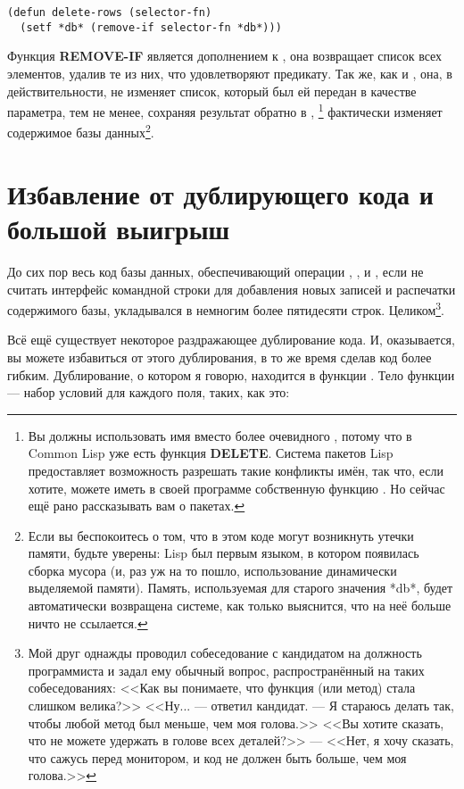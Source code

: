 \begin{lstlisting}
(defun delete-rows (selector-fn)
  (setf *db* (remove-if selector-fn *db*)))
\end{lstlisting}

Функция \textbf{REMOVE-IF} является дополнением к , она возвращает
список всех элементов, удалив те из них, что удовлетворяют предикату. Так же, как и
, она, в действительности, не изменяет список, который был ей передан
в качестве параметра, тем не менее, сохраняя результат обратно в ,
\footnote{Вы должны использовать имя  вместо более
  очевидного , потому что в Common Lisp уже есть функция
  \textbf{DELETE}. Система пакетов Lisp предоставляет возможность разрешать такие
  конфликты имён, так что, если хотите, можете иметь в своей программе собственную функцию
  . Но сейчас ещё рано рассказывать вам о пакетах.} фактически изменяет
содержимое базы данных\footnote{Если вы беспокоитесь о том, что в этом коде могут
  возникнуть утечки памяти, будьте уверены: Lisp был первым языком, в котором появилась
  сборка мусора (и, раз уж на то пошло, использование динамически выделяемой
  памяти). Память, используемая для старого значения *db*, будет автоматически возвращена
  системе, как только выяснится, что на неё больше ничто не ссылается.}.

\section{Избавление от дублирующего кода и большой выигрыш}

До сих пор весь код базы данных, обеспечивающий операции , ,
 и , если не считать интерфейс командной строки для добавления
новых записей и распечатки содержимого базы, укладывался в немногим более пятидесяти
строк. Целиком\footnote{Мой друг однажды проводил собеседование с кандидатом на должность
  программиста и задал ему обычный вопрос, распространённый на таких собеседованиях: <<Как
  вы понимаете, что функция (или метод) стала слишком велика?>> <<Ну... --- ответил
  кандидат. --- Я стараюсь делать так, чтобы любой метод был меньше, чем моя голова.>>  <<Вы
  хотите сказать, что не можете удержать в голове всех деталей?>> --- <<Нет, я хочу сказать,
  что сажусь перед монитором, и код не должен быть больше, чем моя голова.>>}.

Всё ещё существует некоторое раздражающее дублирование кода. И, оказывается, вы можете
избавиться от этого дублирования, в то же время сделав код более гибким. Дублирование, о
котором я говорю, находится в функции . Тело функции  --- набор
условий для каждого поля, таких, как это:

